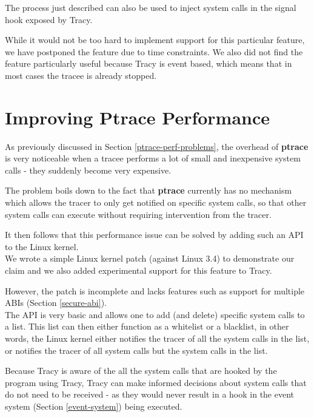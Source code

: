\documentclass[a4paper, 10pt]{report}
\begin{document}
The process just described can also be used to inject system calls
in the signal hook exposed by Tracy.

While it would not be too hard to implement support for this particular
feature, we have postponed the feature due to time constraints. We also
did not find the feature particularly useful because Tracy is event based,
which means that in most cases the tracee is already stopped.

\section{Improving Ptrace Performance}
\label{ptrace-perf}

As previously discussed in Section \ref{ptrace-perf-problems}, the overhead
of \textbf{ptrace} is very noticeable when a tracee performs a lot of
small and inexpensive system calls - they suddenly become very expensive.

The problem boils down to the fact that \textbf{ptrace} currently
has no mechanism which allows the tracer to only get notified on specific
system calls, so that other system calls can execute without requiring
intervention from the tracer.

It then follows that this performance issue can be solved by adding such
an API to the Linux kernel. \\

We wrote a simple Linux kernel patch (against Linux 3.4) to demonstrate
our claim and we also added experimental support for this feature to Tracy.

However, the patch is incomplete and lacks features such as support for
multiple ABIs (Section \ref{secure-abi}). \\

The API is very basic and allows one to add (and delete) specific system
calls to a list. This list can then either function as a whitelist or a
blacklist, in other words, the Linux kernel either notifies the tracer of
all the system calls in the list, or notifies the tracer of all system calls
but the system calls in the list.


Because Tracy is aware of the all the system calls that are hooked by the
program using Tracy, Tracy can make informed decisions about system calls
that do not need to be received - as they would never result in a hook in
the event system (Section \ref{event-system}) being executed.
\end{document}
